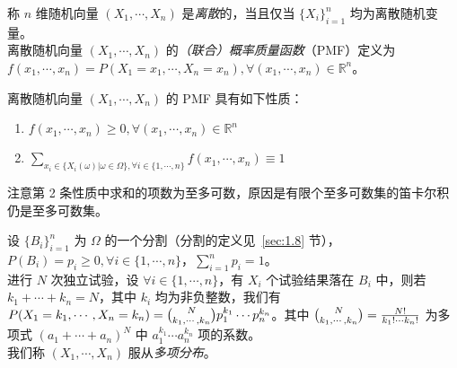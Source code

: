 \documentclass[../main.tex]{subfiles}
\begin{document}
\begin{definition}\label{def:3.2.1}
    称 $n$ 维随机向量 $(X_1,\cdots,X_n)$ 是\emph{离散}的，当且仅当 $\{X_i\}_{i=1}^n$ 均为离散随机变量。\\
    离散随机向量 $(X_1,\cdots,X_n)$ 的\emph{（联合）概率质量函数}（PMF）定义为 $f(x_1,\cdots,x_n)=P(X_1=x_1,\cdots,X_n=x_n),\forall(x_1,\cdots,x_n)\in \mathbb R^n$。
\end{definition}

\begin{proposition}
    离散随机向量 $(X_1,\cdots,X_n)$ 的 PMF 具有如下性质：
    \begin{enumerate}
        \item $f(x_1,\cdots,x_n)\geq0,\forall(x_1,\cdots,x_n)\in \mathbb R^n$
        \item $\sum_{x_i\in\{X_i(\omega)|\omega\in\Omega\},\forall i\in\{1,\cdots,n\}}f(x_1,\cdots,x_n)\equiv1$
    \end{enumerate}
\end{proposition}

注意第 2 条性质中求和的项数为至多可数，原因是有限个至多可数集的笛卡尔积仍是至多可数集。

\begin{example}
    设 $\{B_i\}_{i=1}^n$ 为 $\Omega$ 的一个分割（分割的定义见~\ref{sec:1.8} 节），$P(B_i)=p_i\geq0,\forall i\in\{1,\cdots,n\}$，$\sum_{i=1}^n p_i=1$。\\
    进行 $N$ 次独立试验，设 $\forall i\in\{1,\cdots,n\}$，有 $X_i$ 个试验结果落在 $B_i$ 中，则若 $k_1+\cdots+k_n=N$，其中 $k_i$ 均为非负整数，我们有 $P(X_1=k_1,\cdots,X_n=k_n)=\tbinom{N}{k_1,\cdots,k_n}p_1^{k_1}\cdots p_n^{k_n}$。其中 $\tbinom{N}{k_1,\cdots,k_n}=\frac{N!}{k_1!\cdots k_n!}$ 为多项式 $(a_1+\cdots+a_n)^N$ 中 $a_1^{k_1}\cdots a_n^{k_n}$ 项的系数。\\
    我们称 $(X_1,\cdots,X_n)$ 服从\emph{多项分布}。
\end{example}
\end{document}
